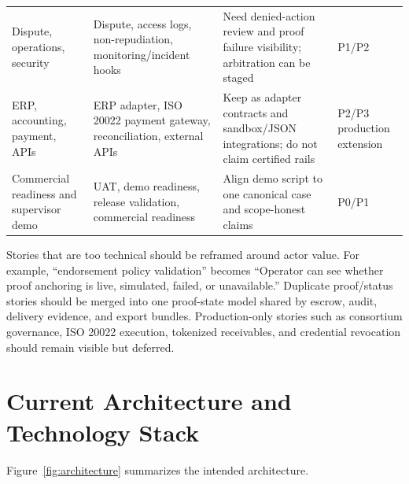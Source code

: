 \documentclass[conference]{IEEEtran}
\begin{document}
\begin{table}[t]
\begin{tabularx}{\textwidth}{P{3.4cm} P{4.2cm} P{4.1cm} Y}
Dispute, operations, security & Dispute, access logs, non-repudiation, monitoring/incident hooks & Need denied-action review and proof failure visibility; arbitration can be staged & P1/P2 \\
ERP, accounting, payment, APIs & ERP adapter, ISO 20022 payment gateway, reconciliation, external APIs & Keep as adapter contracts and sandbox/JSON integrations; do not claim certified rails & P2/P3 production extension \\
Commercial readiness and supervisor demo & UAT, demo readiness, release validation, commercial readiness & Align demo script to one canonical case and scope-honest claims & P0/P1 \\
\bottomrule
\end{tabularx}
\end{table}

Stories that are too technical should be reframed around actor value. For example, ``endorsement policy validation'' becomes ``Operator can see whether proof anchoring is live, simulated, failed, or unavailable.'' Duplicate proof/status stories should be merged into one proof-state model shared by escrow, audit, delivery evidence, and export bundles. Production-only stories such as consortium governance, ISO 20022 execution, tokenized receivables, and credential revocation should remain visible but deferred.

\section{Current Architecture and Technology Stack}
Figure~\ref{fig:architecture} summarizes the intended architecture.
\end{document}

